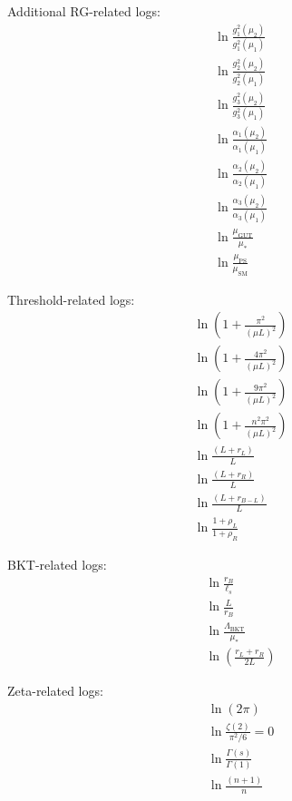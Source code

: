 \documentclass[11pt,a4paper]{article}
\begin{document}
Additional RG-related logs:
\begin{align}
\label{eq:log-rg-1} &\ln\frac{g_1^2(\mu_2)}{g_1^2(\mu_1)} \\
\label{eq:log-rg-2} &\ln\frac{g_2^2(\mu_2)}{g_2^2(\mu_1)} \\
\label{eq:log-rg-3} &\ln\frac{g_3^2(\mu_2)}{g_3^2(\mu_1)} \\
\label{eq:log-rg-4} &\ln\frac{\alpha_1(\mu_2)}{\alpha_1(\mu_1)} \\
\label{eq:log-rg-5} &\ln\frac{\alpha_2(\mu_2)}{\alpha_2(\mu_1)} \\
\label{eq:log-rg-6} &\ln\frac{\alpha_3(\mu_2)}{\alpha_3(\mu_1)} \\
\label{eq:log-rg-7} &\ln\frac{\mu_{\text{GUT}}}{\mu_*} \\
\label{eq:log-rg-8} &\ln\frac{\mu_{\text{PS}}}{\mu_{\text{SM}}}
\end{align}

Threshold-related logs:
\begin{align}
\label{eq:log-th-1} &\ln\left(1 + \frac{\pi^2}{(\mu L)^2}\right) \\
\label{eq:log-th-2} &\ln\left(1 + \frac{4\pi^2}{(\mu L)^2}\right) \\
\label{eq:log-th-3} &\ln\left(1 + \frac{9\pi^2}{(\mu L)^2}\right) \\
\label{eq:log-th-4} &\ln\left(1 + \frac{n^2\pi^2}{(\mu L)^2}\right) \\
\label{eq:log-th-5} &\ln\frac{(L+r_L)}{L} \\
\label{eq:log-th-6} &\ln\frac{(L+r_R)}{L} \\
\label{eq:log-th-7} &\ln\frac{(L+r_{B-L})}{L} \\
\label{eq:log-th-8} &\ln\frac{1+\rho_L}{1+\rho_R}
\end{align}

BKT-related logs:
\begin{align}
\label{eq:log-bkt-1} &\ln\frac{r_B}{\ell_s} \\
\label{eq:log-bkt-2} &\ln\frac{L}{r_B} \\
\label{eq:log-bkt-3} &\ln\frac{\Lambda_{\text{BKT}}}{\mu_*} \\
\label{eq:log-bkt-4} &\ln\left(\frac{r_L + r_R}{2L}\right)
\end{align}

Zeta-related logs:
\begin{align}
\label{eq:log-zeta-1} &\ln(2\pi) \\
\label{eq:log-zeta-2} &\ln\frac{\zeta(2)}{\pi^2/6} = 0 \\
\label{eq:log-zeta-3} &\ln\frac{\Gamma(s)}{\Gamma(1)} \\
\label{eq:log-zeta-4} &\ln\frac{(n+1)}{n}
\end{align}
\end{document}

